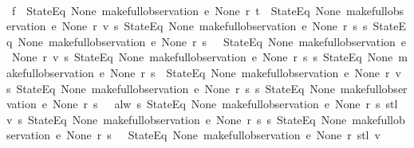 \begin{isabellebody}
%
\isadelimproof
%
\endisadelimproof
%
\isatagproof
{}\isamarkupfalse%
\ {\isacharminus}\isanewline
{}\isamarkupfalse%
\ f{}{\isacharcolon}\ {\isachardoublequoteopen}{\isacharparenleft}{\isasymnot}\ StateEq\ None\ {\isacharparenleft}make{\isacharunderscore}full{\isacharunderscore}observation\ e\ None\ r\ t{\isacharparenright}\ {\isasymor}\ StateEq\ None\ {\isacharparenleft}make{\isacharunderscore}full{\isacharunderscore}observation\ e\ None\ r\ {\isacharparenleft}v{}{\isacharunderscore}{}\ {\isacharparenleft}{\isasymlambda}s{\isachardot}\ StateEq\ None\ {\isacharparenleft}make{\isacharunderscore}full{\isacharunderscore}observation\ e\ None\ r\ s{\isacharparenright}{\isacharparenright}\ {\isacharparenleft}{\isasymlambda}s{\isachardot}\ StateEq\ None\ {\isacharparenleft}make{\isacharunderscore}full{\isacharunderscore}observation\ e\ None\ r\ s{\isacharparenright}{\isacharparenright}{\isacharparenright}{\isacharparenright}\ {\isasymand}\ {\isasymnot}\ StateEq\ None\ {\isacharparenleft}make{\isacharunderscore}full{\isacharunderscore}observation\ e\ None\ r\ {\isacharparenleft}v{}{\isacharunderscore}{}\ {\isacharparenleft}{\isasymlambda}s{\isachardot}\ StateEq\ None\ {\isacharparenleft}make{\isacharunderscore}full{\isacharunderscore}observation\ e\ None\ r\ s{\isacharparenright}{\isacharparenright}\ {\isacharparenleft}{\isasymlambda}s{\isachardot}\ StateEq\ None\ {\isacharparenleft}make{\isacharunderscore}full{\isacharunderscore}observation\ e\ None\ r\ s{\isacharparenright}{\isacharparenright}{\isacharparenright}{\isacharparenright}\ {\isasymor}\ StateEq\ None\ {\isacharparenleft}make{\isacharunderscore}full{\isacharunderscore}observation\ e\ None\ r\ {\isacharparenleft}v{}{\isacharunderscore}{}\ {\isacharparenleft}{\isasymlambda}s{\isachardot}\ StateEq\ None\ {\isacharparenleft}make{\isacharunderscore}full{\isacharunderscore}observation\ e\ None\ r\ s{\isacharparenright}{\isacharparenright}\ {\isacharparenleft}{\isasymlambda}s{\isachardot}\ StateEq\ None\ {\isacharparenleft}make{\isacharunderscore}full{\isacharunderscore}observation\ e\ None\ r\ s{\isacharparenright}{\isacharparenright}{\isacharparenright}{\isacharparenright}\ {\isasymand}\ {\isasymnot}\ alw\ {\isacharparenleft}{\isasymlambda}s{\isachardot}\ StateEq\ None\ {\isacharparenleft}make{\isacharunderscore}full{\isacharunderscore}observation\ e\ None\ r\ s{\isacharparenright}{\isacharparenright}\ {\isacharparenleft}stl\ {\isacharparenleft}v{}{\isacharunderscore}{}\ {\isacharparenleft}{\isasymlambda}s{\isachardot}\ StateEq\ None\ {\isacharparenleft}make{\isacharunderscore}full{\isacharunderscore}observation\ e\ None\ r\ s{\isacharparenright}{\isacharparenright}\ {\isacharparenleft}{\isasymlambda}s{\isachardot}\ StateEq\ None\ {\isacharparenleft}make{\isacharunderscore}full{\isacharunderscore}observation\ e\ None\ r\ s{\isacharparenright}{\isacharparenright}{\isacharparenright}{\isacharparenright}\ {\isasymand}\ {\isasymnot}\ StateEq\ None\ {\isacharparenleft}make{\isacharunderscore}full{\isacharunderscore}observation\ e\ None\ r\ {\isacharparenleft}stl\ {\isacharparenleft}v{}{\isacharunderscore}{}\ 
\end{isabellebody}
